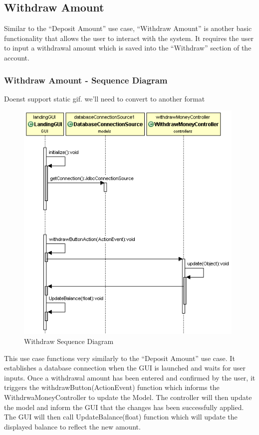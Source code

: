 \documentclass[12pt]{article}
\begin{document}
\subsection{Withdraw Amount}
Similar to the “Deposit Amount” use case, “Withdraw Amount” is another basic functionality that allows the user to interact with the system. It requires the user to input a withdrawal amount which is saved into the “Withdraw” section of the account. 

\subsubsection{Withdraw Amount - Sequence Diagram}
 Doenst support static gif. we'll need to convert to another format
\begin{figure}[h!]
  \centering
  \includegraphics[width=110mm]{withdraw_sequence.png}
  \caption{Withdraw Sequence Diagram}
\end{figure}

This use case functions very similarly to the “Deposit Amount” use case. It establishes a database connection when the GUI is launched and waits for user inputs. Once a withdrawal amount has been entered and confirmed by the user, it triggers the withdrawButton(ActionEvent) function which informs the WithdrwaMoneyController to update the Model. The controller will then update the model and inform the GUI that the changes has been successfully applied. The GUI will then call UpdateBalance(float) function which will update the displayed balance to reflect the new amount.
\end{document}
